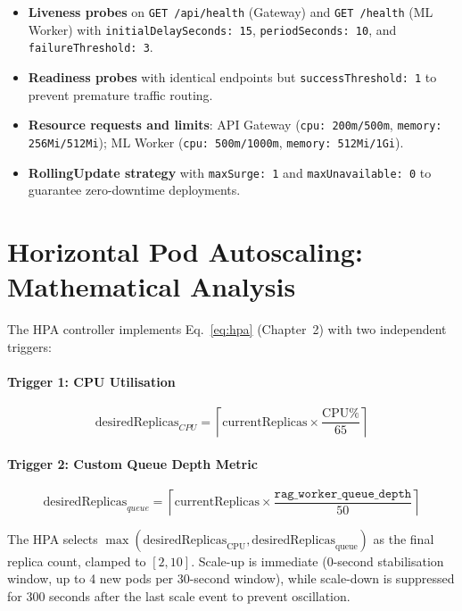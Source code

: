 \documentclass[12pt,a4paper]{report}
\begin{document}
\begin{itemize}[leftmargin=1.5cm]
  \item \textbf{Liveness probes} on \texttt{GET /api/health} (Gateway) and
        \texttt{GET /health} (ML Worker) with \texttt{initialDelaySeconds: 15},
        \texttt{periodSeconds: 10}, and \texttt{failureThreshold: 3}.
  \item \textbf{Readiness probes} with identical endpoints but
        \texttt{successThreshold: 1} to prevent premature traffic routing.
  \item \textbf{Resource requests and limits}: API Gateway
        (\texttt{cpu: 200m/500m}, \texttt{memory: 256Mi/512Mi}); ML Worker
        (\texttt{cpu: 500m/1000m}, \texttt{memory: 512Mi/1Gi}).
  \item \textbf{RollingUpdate strategy} with \texttt{maxSurge: 1} and
        \texttt{maxUnavailable: 0} to guarantee zero-downtime deployments.
\end{itemize}

\section{Horizontal Pod Autoscaling: Mathematical Analysis}

The HPA controller implements Eq.~\eqref{eq:hpa} (Chapter~2) with two
independent triggers:

\paragraph{Trigger 1: CPU Utilisation}
\begin{equation}
  \text{desiredReplicas}_{CPU} =
  \left\lceil \text{currentReplicas} \times \frac{\text{CPU\%}}{65} \right\rceil
\end{equation}

\paragraph{Trigger 2: Custom Queue Depth Metric}
\begin{equation}
  \text{desiredReplicas}_{queue} =
  \left\lceil \text{currentReplicas} \times
  \frac{\texttt{rag\_worker\_queue\_depth}}{50} \right\rceil
\end{equation}

The HPA selects $\max(\text{desiredReplicas}_{\text{CPU}}, \text{desiredReplicas}_{\text{queue}})$ as the final replica count, clamped to
$[2, 10]$. Scale-up is immediate (0-second stabilisation window, up to 4 new
pods per 30-second window), while scale-down is suppressed for 300 seconds
after the last scale event to prevent oscillation.
\end{document}
